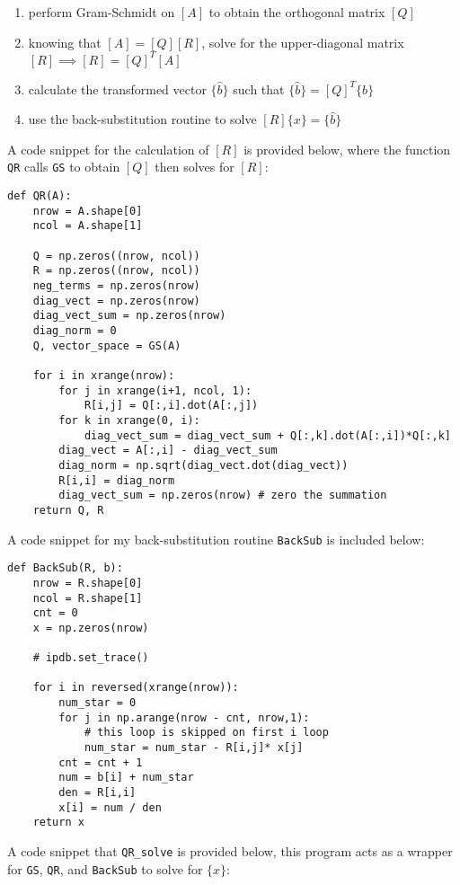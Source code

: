 \documentclass[letterpaper, 10pt, oneside]{article}
\begin{document}
\begin{enumerate}
	\item perform Gram-Schmidt on $[A]$ to obtain the orthogonal matrix $[Q]$
	\item knowing that $[A] = [Q][R]$, solve for the upper-diagonal matrix $[R]\implies [R]=[Q]^T[A]$
	\item calculate the transformed vector $\{\hat{b}\}$ such that $\{\hat{b}\} = [Q]^T\{b\}$
	\item use the back-substitution routine to solve $[R]\{x\} = \{\hat{b}\}$
\end{enumerate}

A code snippet for the calculation of $[R]$ is provided below, where the function \verb|QR| calls \verb|GS| to obtain $[Q]$ then solves for $[R]$:
\begin{lstlisting}
def QR(A):
    nrow = A.shape[0]
    ncol = A.shape[1]

    Q = np.zeros((nrow, ncol))
    R = np.zeros((nrow, ncol))
    neg_terms = np.zeros(nrow)
    diag_vect = np.zeros(nrow)
    diag_vect_sum = np.zeros(nrow)
    diag_norm = 0
    Q, vector_space = GS(A)
    
    for i in xrange(nrow):
        for j in xrange(i+1, ncol, 1):
            R[i,j] = Q[:,i].dot(A[:,j])
        for k in xrange(0, i):
            diag_vect_sum = diag_vect_sum + Q[:,k].dot(A[:,i])*Q[:,k]
        diag_vect = A[:,i] - diag_vect_sum
        diag_norm = np.sqrt(diag_vect.dot(diag_vect))
        R[i,i] = diag_norm
        diag_vect_sum = np.zeros(nrow) # zero the summation
    return Q, R
\end{lstlisting}

A code snippet for my back-substitution routine \verb|BackSub| is included below:
\begin{lstlisting}
def BackSub(R, b):
    nrow = R.shape[0]
    ncol = R.shape[1]
    cnt = 0
    x = np.zeros(nrow)

    # ipdb.set_trace()

    for i in reversed(xrange(nrow)):
        num_star = 0
        for j in np.arange(nrow - cnt, nrow,1):
            # this loop is skipped on first i loop
            num_star = num_star - R[i,j]* x[j]
        cnt = cnt + 1
        num = b[i] + num_star
        den = R[i,i]
        x[i] = num / den
    return x
\end{lstlisting}

A code snippet that \verb|QR_solve| is provided below, this program acts as a wrapper for \verb|GS|, \verb|QR|, and \verb|BackSub| to solve for $\{x\}$:
\end{document}
